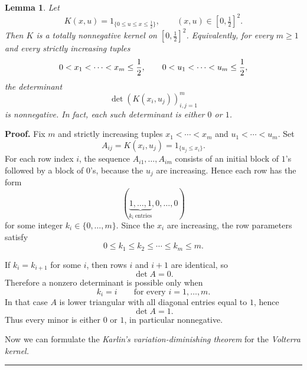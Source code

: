 \documentclass[onecolumn]{article}
\newtheorem{lemma}[theorem]{Lemma}
\newenvironment{proof}[1][Proof]{\noindent\textbf{#1.} }{\ \rule{0.5em}{0.5em}}
\begin{document}
\begin{lemma}
\label{Volterra-kernel-TN} Let 
\begin{equation}
K(x,u)=1_{\{0\leq u\leq x\leq \tfrac{1}{2}\}},\qquad (x,u)\in \left[ 0,%
\tfrac{1}{2}\right] ^{2}.  \label{1320}
\end{equation}%
Then $K$ is a totally nonnegative kernel on $\left[ 0,\tfrac{1}{2}\right]
^{2}$. Equivalently, for every $m\geq 1$ and every strictly increasing
tuples 
\begin{equation}
0<x_{1}<\cdots <x_{m}\leq \frac{1}{2},\qquad 0<u_{1}<\cdots <u_{m}\leq \frac{%
1}{2},  \label{1321}
\end{equation}%
the determinant 
\begin{equation}
\det \!(K(x_{i},u_{j}))_{i,j=1}^{m}  \label{1321.1}
\end{equation}%
is nonnegative. In fact, each such determinant is either $0$ or $1$.
\end{lemma}

\begin{proof}
Fix $m$ and strictly increasing tuples $x_{1}<\cdots <x_{m}$ and $%
u_{1}<\cdots <u_{m}$. Set 
\begin{equation}
A_{ij}=K(x_{i},u_{j})=1_{\{u_{j}\leq x_{i}\}}.  \label{1322}
\end{equation}%
For each row index $i$, the sequence $A_{i1},\dots ,A_{im}$ consists of an
initial block of $1$'s followed by a block of $0$'s, because the $u_{j}$ are
increasing. Hence each row has the form 
\begin{equation}
(\underbrace{1,\dots ,1}_{k_{i}\ \text{entries}},0,\dots ,0)  \label{1323}
\end{equation}%
for some integer $k_{i}\in \{0,\dots ,m\}$. Since the $x_{i}$ are
increasing, the row parameters satisfy 
\begin{equation}
0\leq k_{1}\leq k_{2}\leq \cdots \leq k_{m}\leq m.  \label{1324}
\end{equation}

If $k_{i}=k_{i+1}$ for some $i$, then rows $i$ and $i+1$ are identical, so 
\begin{equation}
\det A=0.  \label{1325}
\end{equation}%
Therefore a nonzero determinant is possible only when 
\begin{equation}
k_{i}=i\qquad \text{for every }i=1,\dots ,m.  \label{1326}
\end{equation}%
In that case $A$ is lower triangular with all diagonal entries equal to $1$,
hence 
\begin{equation}
\det A=1.  \label{1327}
\end{equation}%
Thus every minor is either $0$ or $1$, in particular nonnegative.

Now we can formulate the \textit{Karlin's variation-diminishing theorem} for
the \textit{Volterra kernel.}\hfill
\end{proof}
\end{document}
